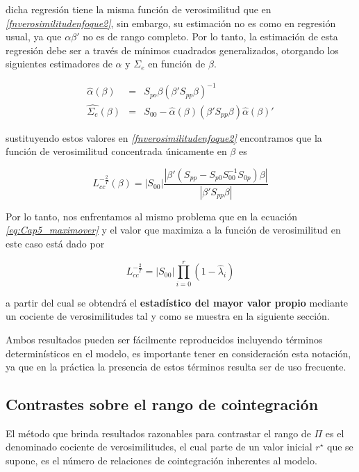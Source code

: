dicha regresión tiene la misma función de verosimilitud que en \textit{\ref{fnverosimilitudenfoque2}}, sin embargo, su estimación no es como en regresión usual, ya que $\alpha\beta'$ no es de rango completo. Por lo tanto, la estimación de esta regresión debe ser a través de mínimos cuadrados generalizados, otorgando los siguientes estimadores de $\alpha$ y $\Sigma_e$ en función de $\beta$.

\begin{eqnarray}
\widehat{\alpha}(\beta) &=& S_{po}\beta(\beta'S_{pp}\beta)^{-1} \\
\widehat{\Sigma_e}(\beta) &=& S_{00}-\widehat{\alpha}(\beta)(\beta'S_{pp}\beta)\widehat{\alpha}(\beta)'
\end{eqnarray} 

sustituyendo estos valores en \textit{\ref{fnverosimilitudenfoque2}} encontramos que la función de verosimilitud concentrada únicamente en $\beta$ es

\begin{equation}
L_{cc}^{-\frac{2}{T}}(\beta)=\left |S_{00} \right | \frac{\left | \beta'\left ( S_{pp}-S_{p0}S_{00}^{-1}S_{0p} \right )\beta \right |}{\left | \beta'S_{pp}\beta \right |}
\end{equation}

Por lo tanto, nos enfrentamos al mismo problema que en la ecuación \textit{\ref{eq:Cap5_maximover}} y el valor que maximiza a la función de verosimilitud en este caso está dado por 

\begin{equation}
L_{cc}^{-\frac{2}{T}}= \left |S_{00} \right |\prod_{i=0}^{r}\left ( 1-\widehat{\lambda}_i \right )
\end{equation}


a partir del cual se obtendrá el \textbf{ estadístico del mayor valor propio} mediante un cociente de verosimilitudes tal y como se muestra en la siguiente sección.\bigskip 

Ambos resultados pueden ser fácilmente  reproducidos incluyendo términos determinísticos en el modelo, es importante tener en consideración esta notación, ya que en la práctica la presencia de estos términos resulta ser de uso frecuente.  
 


 \subsection{Contrastes sobre el rango de cointegración}

El método que brinda resultados razonables para contrastar el rango de $\Pi$ es el denominado cociente de verosimilitudes, el cual parte de un valor inicial $r^{\star}$ que se supone, es el número de relaciones de cointegración inherentes al modelo. \bigskip 


